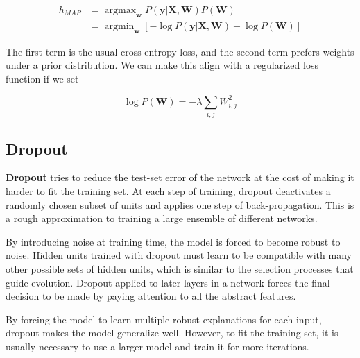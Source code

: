 \documentclass{article}
\DeclareMathOperator*{\argmin}{argmin}
\DeclareMathOperator*{\argmax}{argmax}
\begin{document}
\begin{align*}
h_{MAP} &= \argmax_{\textbf{w}} P(\textbf{y} | \textbf{X}, \textbf{W}) P(\textbf{W}) \\
 &= \argmin_{\textbf{w}} \left[ - \log P(\textbf{y} | \textbf{X}, \textbf{W}) - \log P(\textbf{W}) \right]
\end{align*}

The first term is the usual cross-entropy loss, and the second term prefers weights
under a prior distribution. We can make this align with a regularized loss function
if we set

\[
\log P(\textbf{W}) = - \lambda \sum_{i,j} W_{i,j}^2
\]

\subsection{Dropout}

\textbf{Dropout} tries to reduce the test-set error of the network at the cost of
making it harder to fit the training set. At each step of training, dropout 
deactivates a randomly chosen subset of units and applies one step of back-propagation.
This is a rough approximation to training a large ensemble of different networks.

By introducing noise at training time, the model is forced to become robust to noise.
Hidden units trained with dropout must learn to be compatible with many other possible
sets of hidden units, which is similar to the selection processes that guide evolution.
Dropout applied to later layers in a network forces the final decision to be made
by paying attention to all the abstract features.

By forcing the model to learn multiple robust explanations for each input, dropout 
makes the model generalize well. However, to fit the training set, it is usually
necessary to use a larger model and train it for more iterations.
\end{document}
